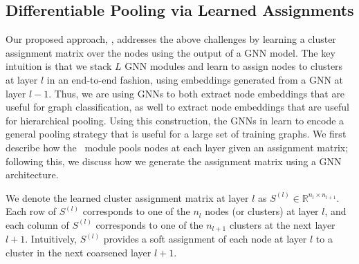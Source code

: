 \subsection{Differentiable Pooling via Learned Assignments}

Our proposed approach, \name, addresses the above challenges by learning a cluster assignment matrix over the nodes using the output of a GNN model.
The key intuition is that we stack $L$ GNN modules and learn to assign nodes to clusters at layer $l$ in an end-to-end fashion, using embeddings generated from a GNN at layer $l-1$.
Thus, we are using GNNs to both extract node embeddings that are useful for graph classification, as well to extract node embeddings that are useful for hierarchical pooling.
Using this construction, the GNNs in \name learn to encode a general pooling strategy that is useful for a large set of training graphs. 
We first describe how the \name\ module pools nodes at each layer given an assignment matrix; following this, we discuss how we generate the assignment matrix using a GNN architecture. 

We denote the learned cluster assignment matrix at layer $l$ as $S^{(l)} \in \mathbb{R}^{n_l \times n_{l+1}}$. 
Each row of $S^{(l)}$ corresponds to one of the $n_l$ nodes (or clusters) at layer $l$, and each column of $S^{(l)}$ corresponds to one of the $n_{l+1}$ clusters at the next layer $l+1$. 
Intuitively, $S^{(l)}$ provides a soft assignment of each node at layer $l$ to a cluster in the next coarsened layer $l+1$.

